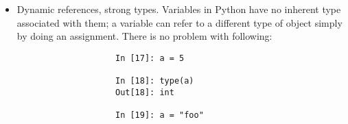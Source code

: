 \documentclass{article}
\newtheorem{remark}{Remark}
\begin{document}
\begin{itemize}
\begin{itemize}
\begin{itemize}
\begin{itemize}
				-- Hiểu được ngữ nghĩa của các tham chiếu trong Python, \& khi nào, như thế nào, \& lý do tại sao dữ liệu được sao chép, đặc biệt quan trọng khi bạn làm việc với các tập dữ liệu lớn hơn trong Python.					
				\begin{remark}
					Assignment is also referred to as {\rm binding}, as we are binding a name to an object. Variable names that have been assigned may occasionally be referred to as bound variables.
				\end{remark}
				When pass objects as arguments to a function, new local variables are created referencing original objects without any copying. If bind a new object to a variable inside a function, that will not overwrite a variable of same name in ``scope'' outside of function (``parent scope''). Therefore possible to alter internals of a mutable argument. Suppose had following function:
				\begin{verbatim}
					In [13]: def append_element(some_list, element):
					....:     some_list.append(element)
				\end{verbatim}
				Then have:
				\begin{verbatim}
					In [14]: data = [1, 2, 3]
					
					In [15]: append_element(data, 4)
					
					In [16]: data
					Out[16]: [1, 2, 3, 4]
				\end{verbatim}
				\item {\sf Dynamic references, strong types.} Variables in Python have no inherent type associated with them; a variable can refer to a different type of object simply by doing an assignment. There is no problem with following:
				\begin{verbatim}
					In [17]: a = 5
					
					In [18]: type(a)
					Out[18]: int
					
					In [19]: a = "foo"
					

\end{verbatim}
\end{itemize}
\end{itemize}
\end{itemize}
\end{itemize}
\end{document}
